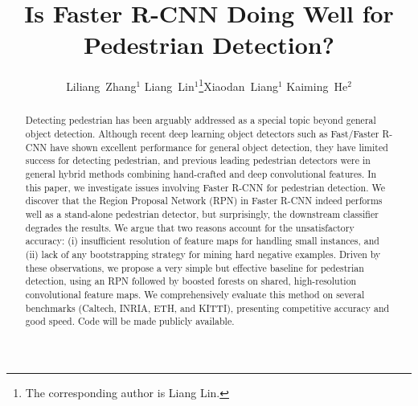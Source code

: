 \documentclass[runningheads]{llncs}
\begin{document}
\pagestyle{headings}
\mainmatter

\title{Is Faster R-CNN Doing Well for \\ Pedestrian Detection?} 

\titlerunning{~}

\authorrunning{~}







\author{Liliang~Zhang$^{1}$  \quad Liang~Lin$^{1}$\thanks{The corresponding author is Liang Lin.}\quad Xiaodan~Liang$^{1}$  \quad Kaiming~He$^{2}$}




\maketitle

\begin{abstract}
Detecting pedestrian has been arguably addressed as a special topic beyond general object detection. Although recent deep learning object detectors such as Fast/Faster R-CNN \cite{girshickICCV15fastrcnn,ren2015faster} have shown excellent performance for general object detection, they have limited success for detecting pedestrian, and previous leading pedestrian detectors were in general hybrid methods combining hand-crafted and deep convolutional features. In this paper, we investigate issues involving Faster R-CNN \cite{ren2015faster} for pedestrian detection. We discover that the Region Proposal Network (RPN) in Faster R-CNN indeed performs well as a stand-alone pedestrian detector, but surprisingly, the downstream classifier degrades the results. We argue that two reasons account for the unsatisfactory accuracy: (i) insufficient resolution of feature maps for handling small instances, and (ii) lack of any bootstrapping strategy for mining hard negative examples. Driven by these observations, we propose a very simple but effective baseline for pedestrian detection, using an RPN followed by boosted forests on shared, high-resolution convolutional feature maps. We comprehensively evaluate this method on several benchmarks (Caltech, INRIA, ETH, and KITTI), presenting competitive accuracy and good speed. Code will be made publicly available.

\end{abstract}
\end{document}
